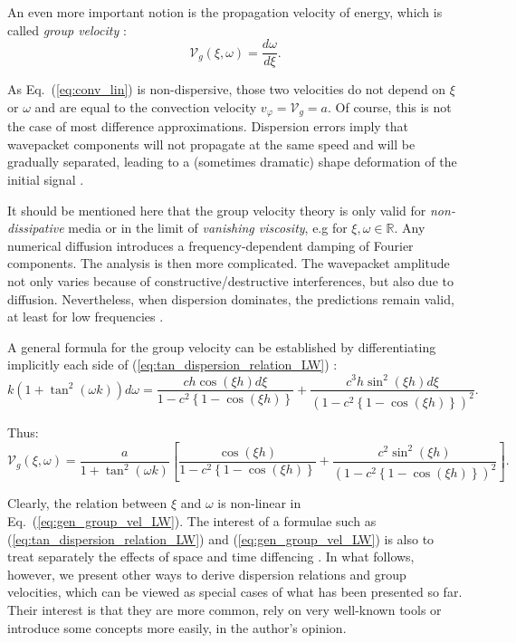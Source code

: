 \noindent An even more important notion is the propagation velocity of energy, which is called \emph{group velocity} \cite{Lighthill:1978}: 
\begin{equation}
\label{eq:group_vel}
\mathcal{V}_{g}(\xi,\omega) = \frac{d\omega}{d\xi}.
\end{equation}

\noindent As Eq.~(\ref{eq:conv_lin}) is non-dispersive, those two velocities do not depend on $\xi$ or $\omega$ and are equal to the convection velocity $v_{\varphi} = \mathcal{V}_{g} = a$. Of course, this is not the case of most difference approximations. Dispersion errors imply that wavepacket components will not propagate at the same speed and will be gradually separated, leading to a (sometimes dramatic) shape deformation of the initial signal \cite{Trefethen:1996}.

\noindent It should be mentioned here that the group velocity theory is only valid for \emph{non-dissipative} media or in the limit of \emph{vanishing viscosity}, e.g for $\xi, \omega \in \mathbb{R}$. Any numerical diffusion introduces a frequency-dependent damping of Fourier components. The analysis is then more complicated. The wavepacket amplitude not only varies because of constructive/destructive interferences, but also due to diffusion. Nevertheless, when dispersion dominates, the predictions remain valid, at least for low frequencies \cite{Trefethen:1982}. 

\vskip8mm

\begin{example}
A general formula for the group velocity can be established by differentiating implicitly each side of (\ref{eq:tan_dispersion_relation_LW}) \cite{Sengupta:2004,Trefethen:1982,Trefethen:1996}:
$$ k \left(1 + \tan^2 (\omega k)\right) d\omega =  \frac{c h \cos (\xi h) d\xi}{1 - c^2 \left\{1-\cos (\xi h) \right\}} + \frac{c^3 h \sin^2 (\xi h) d\xi}{\left( 1 - c^2 \left\{1-\cos (\xi h) \right\}\right)^2}.
$$

\noindent Thus:
\begin{equation}
\label{eq:gen_group_vel_LW}
\mathcal{V}_{g}(\xi,\omega) = \frac{a}{1+\tan^2 (\omega k)} \left[\frac{\cos (\xi h)}{1 - c^2 \left\{1-\cos (\xi h) \right\}} + \frac{c^2 \sin^2 (\xi h)}{\left( 1 - c^2 \left\{1-\cos (\xi h) \right\}\right)^2} \right].
\end{equation}
\end{example}

\vskip8mm

\noindent Clearly, the relation between $\xi$ and $\omega$ is non-linear in Eq.~(\ref{eq:gen_group_vel_LW}). The interest of a formulae such as (\ref{eq:tan_dispersion_relation_LW}) and (\ref{eq:gen_group_vel_LW}) is also to treat separately the effects of space and time diffencing \cite{Trefethen:1982}. In what follows, however, we present other ways to derive dispersion relations and group velocities, which can be viewed as special cases of what has been presented so far. Their interest is that they are more common, rely on very well-known tools or introduce some concepts more easily, in the author's opinion. \\

